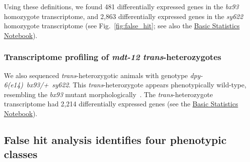 \documentclass[10pt, twocolumn]{article}
\newcommand{\gene}[1]{\mbox{\emph{#1}}}
\newcommand{\strongn}{2,863}
\newcommand{\weakn}{481}
\newcommand{\transn}{2,214}
\begin{document}
Using these definitions, we found \weakn{} differentially expressed
genes in the  \emph{bx93} homozygote transcriptome, and \strongn{}
differentially expressed genes in the \emph{sy622} homozygote transcriptome
(see Fig.~\ref{fig:false_hit}; see also the
\href{https://wormlabcaltech.github.io/med-cafe/notebook/basic.html}{Basic
Statistics Notebook}).

\subsubsection*{Transcriptome profiling of \gene{mdt-12}
             \emph{trans}-heterozygotes}
We also sequenced \emph{trans}-heterozygotic animals with genotype
\gene{dpy-6(e14) bx93/+ sy622}. This \emph{trans}-heterozygote appears
phenotypically wild-type, resembling the \emph{bx93} mutant
morphologically~\cite{Moghal2003}. The \emph{trans}-heterozygote transcriptome
had \transn{} differentially expressed genes (see the
\href{https://wormlabcaltech.github.io/med-cafe/notebook/basic.html}{Basic
Statistics Notebook}).

\subsection*{False hit analysis identifies four phenotypic classes}

%
\end{document}
